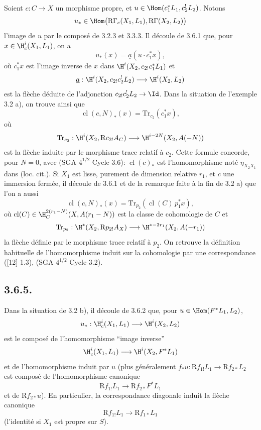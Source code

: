 Soient $c:C\to X$ un morphisme propre, et $u\in\Hom(c_1^*L_1,c_2^!L_2)$. Notons
\[
u_*\in\Hom\bigl(\mathrm{R}\Gamma_c(X_1,L_1),\mathrm{R}\Gamma(X_2,L_2)\bigr)
\]
l'image de $u$ par le composé de 3.2.3 et 3.3.3. Il découle de 3.6.1 que, pour $x\in\H_c^i(X_1,L_1)$, on a
\begin{equation}
u_*(x)=\underline{a}(u\cdot c_1^*x),
\tag{3.6.2}
\end{equation}
où $c_1^*x$ est l'image inverse de $x$ dans $\H^i(X_2,c_{2!}c_1^*L_1)$ et
\[
\underline{a}:\H^i(X_2,c_{2!}c_2^!L_2)\longrightarrow \H^i(X_2,L_2)
\]
est la flèche déduite de l'adjonction $c_{2!}c_2^!L_2\to\Id$. Dans la situation de l'exemple 3.2 a), on trouve ainsi que
\begin{equation}
\operatorname{cl}(c,N)_*(x)=\mathrm{Tr}_{c_2}(c_1^*x),
\tag{3.6.3}
\end{equation}
où
\[
\mathrm{Tr}_{c_2}:\H^i(X_2,\mathrm{R} c_{2!}A_C)\longrightarrow\H^{i-2N}(X_2,A(-N))
\]
est la flèche
induite par le morphisme trace relatif à $c_2$. Cette formule concorde, pour $N=0$, avec (SGA $4^{1/2}$ Cycle 3.6): $\operatorname{cl}(c)_*$ est l'homomorphisme noté $\eta_{X_2X_1}$ dans (loc. cit.). Si $X_1$ est lisse, purement de dimension relative $r_1$, et $c$ une immersion fermée, il découle de 3.6.1 et de la remarque faite à la fin de 3.2 a) que l'on a aussi
\begin{equation}
\operatorname{cl}(c,N)_*(x)=\mathrm{Tr}_{p_2}(\operatorname{cl}(C)\,p_1^*x),
\tag{3.6.4}
\end{equation}
où $\operatorname{cl}(C)\in \H_C^{2(r_1-N)}(X,A(r_1-N))$ est la classe de cohomologie de $C$ et
\[
\mathrm{Tr}_{p_2}:\H^*(X_2,\mathrm{R} p_{2!}A_X)\longrightarrow \H^{*-2r_1}(X_2,A(-r_1))
\]
la flèche définie par le morphisme trace relatif à $p_2$. On retrouve la définition habituelle de l'homomorphisme induit sur la cohomologie par une correspondance ([12] 1.3), (SGA $4^{1/2}$ Cycle 3.2).

\subsection*{3.6.5.}
Dans la situation de 3.2 b), il découle de 3.6.2 que, pour $u\in\Hom(F^*L_1,L_2)$,
\[
u_*:\H_c^i(X_1,L_1)\longrightarrow \H^i(X_2,L_2)
\]
est le composé de l'homomorphisme ``image inverse''
\[
\H_c^i(X_1,L_1)\longrightarrow \H^i(X_2,F^*L_1)
\]
et de l'homomorphisme induit par $u$ (plus généralement $f_*u:\mathrm{R} f_{1!}L_1\to \mathrm{R} f_{2*}L_2$ est composé de l'homomorphisme canonique
\[
\mathrm{R} f_{1!}L_1\longrightarrow \mathrm{R} f_{2*}F^*L_1
\]
et de $\mathrm{R} f_{2*}u$). En particulier, la correspondance diagonale induit la flèche canonique
\[
\mathrm{R} f_{1!}L_1\longrightarrow \mathrm{R} f_{1*}L_1
\]
(l'identité si $X_1$ est propre sur $S$).

